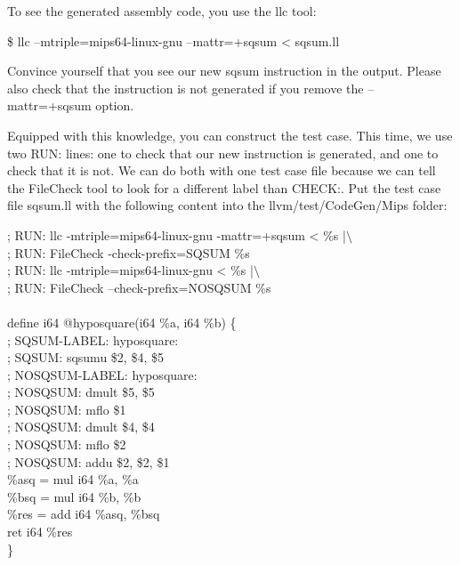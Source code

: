 To see the generated assembly code, you use the llc tool:\par

\begin{tcolorbox}[colback=white,colframe=black]
\$ llc –mtriple=mips64-linux-gnu –mattr=+sqsum < sqsum.ll
\end{tcolorbox}

Convince yourself that you see our new sqsum instruction in the output. Please also check that the instruction is not generated if you remove the –mattr=+sqsum option.\par

Equipped with this knowledge, you can construct the test case. This time, we use two RUN: lines: one to check that our new instruction is generated, and one to check that it is not. We can do both with one test case file because we can tell the FileCheck tool to look for a different label than CHECK:. Put the test case file sqsum.ll with the following content into the llvm/test/CodeGen/Mips folder:\par

\begin{tcolorbox}[colback=white,colframe=black]
; RUN: llc -mtriple=mips64-linux-gnu -mattr=+sqsum < \%s |$\setminus$ \\
; RUN: FileCheck -check-prefix=SQSUM \%s \\
; RUN: llc -mtriple=mips64-linux-gnu < \%s |$\setminus$ \\
; RUN: FileCheck --check-prefix=NOSQSUM \%s \\
\\
define i64 @hyposquare(i64 \%a, i64 \%b) \{ \\
; SQSUM-LABEL: hyposquare: \\
; SQSUM: sqsumu \$2, \$4, \$5 \\
; NOSQSUM-LABEL: hyposquare: \\
; NOSQSUM: dmult \$5, \$5 \\
; NOSQSUM: mflo \$1 \\
; NOSQSUM: dmult \$4, \$4 \\
; NOSQSUM: mflo \$2 \\
; NOSQSUM: addu \$2, \$2, \$1 \\
\hspace*{0.5cm}\%asq = mul i64 \%a, \%a \\
\hspace*{0.5cm}\%bsq = mul i64 \%b, \%b \\
\hspace*{0.5cm}\%res = add i64 \%asq, \%bsq \\
\hspace*{0.5cm}ret i64 \%res \\
\}
\end{tcolorbox}

